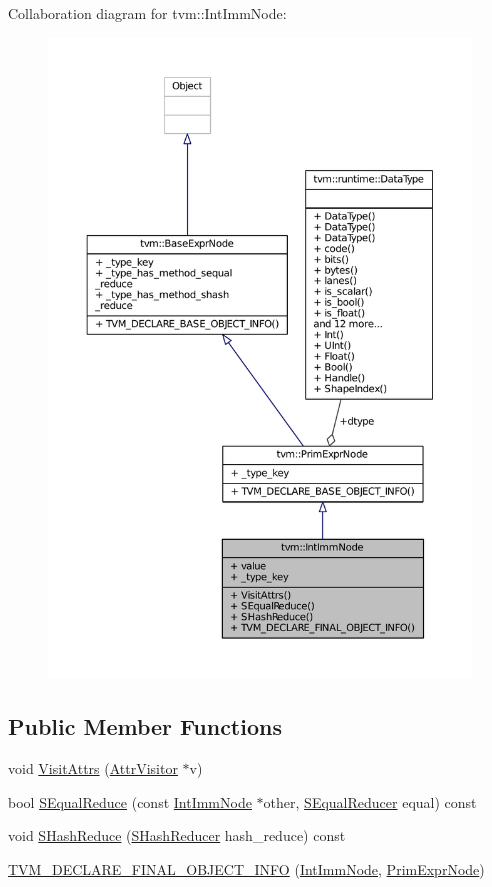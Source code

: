 Collaboration diagram for tvm\+:\+:Int\+Imm\+Node\+:
\nopagebreak
\begin{figure}[H]
\begin{center}
\leavevmode
\includegraphics[width=350pt]{classtvm_1_1IntImmNode__coll__graph}
\end{center}
\end{figure}
\subsection*{Public Member Functions}
\begin{DoxyCompactItemize}
\item 
void \hyperlink{classtvm_1_1IntImmNode_a39ccfd3964e6d132ad8d4e4d544b5949}{Visit\+Attrs} (\hyperlink{classtvm_1_1AttrVisitor}{Attr\+Visitor} $\ast$v)
\item 
bool \hyperlink{classtvm_1_1IntImmNode_a5f94c4f2656fecd870e6c7e3933bf0bb}{S\+Equal\+Reduce} (const \hyperlink{classtvm_1_1IntImmNode}{Int\+Imm\+Node} $\ast$other, \hyperlink{classtvm_1_1SEqualReducer}{S\+Equal\+Reducer} equal) const 
\item 
void \hyperlink{classtvm_1_1IntImmNode_a77f490defd6a33697bec0b7b3cec20c6}{S\+Hash\+Reduce} (\hyperlink{classtvm_1_1SHashReducer}{S\+Hash\+Reducer} hash\+\_\+reduce) const 
\item 
\hyperlink{classtvm_1_1IntImmNode_a222e06d4d1a79d26ee122ba57871eb10}{T\+V\+M\+\_\+\+D\+E\+C\+L\+A\+R\+E\+\_\+\+F\+I\+N\+A\+L\+\_\+\+O\+B\+J\+E\+C\+T\+\_\+\+I\+N\+FO} (\hyperlink{classtvm_1_1IntImmNode}{Int\+Imm\+Node}, \hyperlink{classtvm_1_1PrimExprNode}{Prim\+Expr\+Node})
\end{DoxyCompactItemize}

